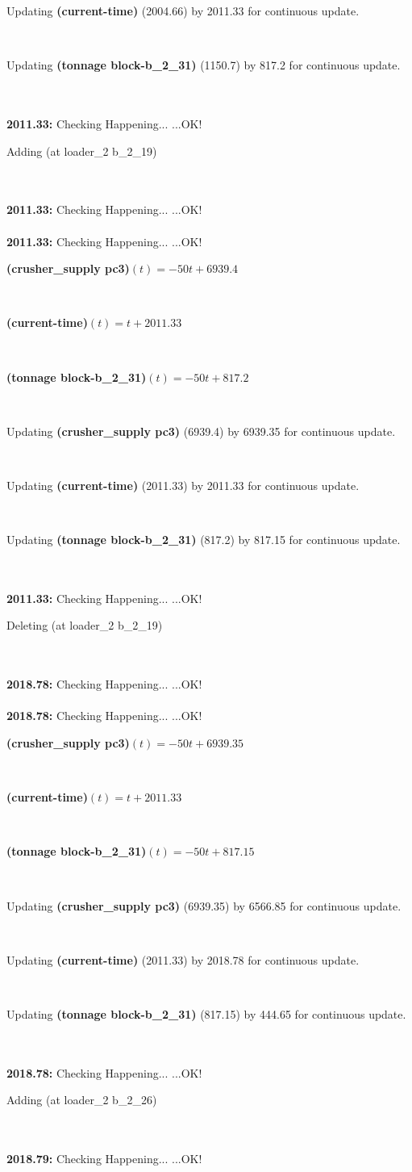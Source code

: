 \documentclass[a4paper,12pt]{article}
\newcommand{\atime}[1]{{\bf #1:}}
\newcommand{\exprn}[1]{{\sf #1}}
\newcommand{\fexprn}[1]{{\small {\bf #1}}}
\newcommand{\checkhappening}{Checking Happening... }
\newcommand{\listrow}[1]{\begin{minipage}[t]{11.5cm} #1 \end{minipage}}
\newcommand{\happeningOK}{...OK!}
\newcommand{\assignmentcts}[3]{\listrow{Updating \fexprn{#1} (#2) by #3 for continuous update.}}
\newcommand{\function}[2]{\listrow{\fexprn{#1}$(t) = #2$}}
\newcommand{\adding}[1]{\listrow{Adding \exprn{#1} }}
\newcommand{\deleting}[1]{\listrow{Deleting \exprn{#1} }}
\begin{document}
\begin{tabbing}
 \> \assignmentcts{(current-time)}{2004.66}{2011.33}\\
 \> \assignmentcts{(tonnage block-b\_2\_31)}{1150.7}{817.2}\\
\\
\atime{2011.33} \> \checkhappening\happeningOK\\
 \> \adding{(at loader\_2 b\_2\_19)}\\
\\
\atime{2011.33} \> \checkhappening\happeningOK\\
\\
\atime{2011.33} \> \checkhappening\happeningOK\\
 \> \function{(crusher\_supply pc3)}{ - 50t + 6939.4}\\
 \> \function{(current-time)}{t + 2011.33}\\
 \> \function{(tonnage block-b\_2\_31)}{ - 50t + 817.2}\\
 \> \assignmentcts{(crusher\_supply pc3)}{6939.4}{6939.35}\\
 \> \assignmentcts{(current-time)}{2011.33}{2011.33}\\
 \> \assignmentcts{(tonnage block-b\_2\_31)}{817.2}{817.15}\\
\\
\atime{2011.33} \> \checkhappening\happeningOK\\
 \> \deleting{(at loader\_2 b\_2\_19)}\\
\\
\atime{2018.78} \> \checkhappening\happeningOK\\
\\
\atime{2018.78} \> \checkhappening\happeningOK\\
 \> \function{(crusher\_supply pc3)}{ - 50t + 6939.35}\\
 \> \function{(current-time)}{t + 2011.33}\\
 \> \function{(tonnage block-b\_2\_31)}{ - 50t + 817.15}\\
 \> \assignmentcts{(crusher\_supply pc3)}{6939.35}{6566.85}\\
 \> \assignmentcts{(current-time)}{2011.33}{2018.78}\\
 \> \assignmentcts{(tonnage block-b\_2\_31)}{817.15}{444.65}\\
\\
\atime{2018.78} \> \checkhappening\happeningOK\\
 \> \adding{(at loader\_2 b\_2\_26)}\\
\\
\atime{2018.79} \> \checkhappening\happeningOK\\

\end{tabbing}
\end{document}
